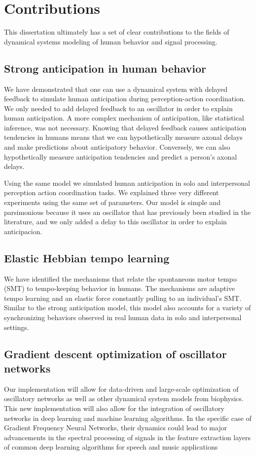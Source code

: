 \documentclass{report}
\begin{document}
\section{Contributions}
This dissertation ultimately has a set of clear contributions to the fields of dynamical systems modeling of human behavior and signal processing. 

\subsection{Strong anticipation in human behavior}
We have demonstrated that one can use a dynamical system with delayed feedback to simulate human anticipation during perception-action coordination. We only needed to add delayed feedback to an oscillator in order to explain human anticipation. A more complex mechanism of anticipation, like statistical inference, was not necessary. Knowing that delayed feedback causes anticipation tendencies in humans means that we can hypothetically measure axonal delays and make predictions about anticipatory behavior. Conversely, we can also hypothetically measure anticipation tendencies and predict a person's axonal delays. 

Using the same model we simulated human anticipation in solo and interpersonal perception action coordination tasks. We explained three very different experiments using the same set of parameters. Our model is simple and parsimonious because it uses an oscillator that has previously been studied in the literature, and we only added a delay to this oscillator in order to explain anticipacion. 

\subsection{Elastic Hebbian tempo learning}
We have identified the mechanisms that relate the spontaneous motor tempo (SMT) to tempo-keeping behavior in humans. The mechanisms are adaptive tempo learning and an elastic force constantly pulling to an individual's SMT. Similar to the strong anticipation model, this model also accounts for a variety of synchronizing behaviors observed in real human data in solo and interpersonal settings.

\subsection{Gradient descent optimization of oscillator networks}
Our implementation will allow for data-driven and large-scale optimization of oscillatory networks as well as other dynamical system models from biophysics. This new implementation will also allow for the integration of oscillatory networks in deep learning and machine learning algorithms. In the specific case of Gradient Frequency Neural Networks, their dynamics could lead to major advancements in the spectral processing of signals in the feature extraction layers of common deep learning algorithms for speech and music applications
\end{document}
